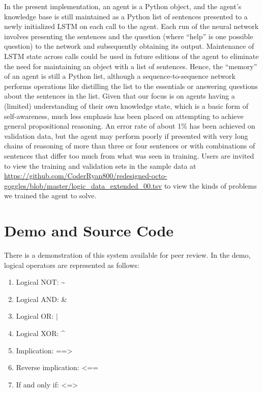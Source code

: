 \documentclass{article}
\begin{document}
In the present implementation, an agent is a Python object, and the agent’s knowledge base is still maintained as a Python list of sentences presented to a newly initialized LSTM on each call to the agent. Each run of the neural network involves presenting the sentences and the question (where “help” is one possible question) to the network and subsequently obtaining its output. Maintenance of LSTM state across calls could be used in future editions of the agent to eliminate the need for maintaining an object with a list of sentences. Hence, the “memory” of an agent is still a Python list, although a sequence-to-sequence network performs operations like distilling the list to the essentials or answering questions about the sentences in the list.
Given that our focus is on agents having a (limited) understanding of their own knowledge state, which is a basic form of self-awareness, much less emphasis has been placed on attempting to achieve general propositional reasoning. An error rate of about 1\% has been achieved on validation data, but the agent may perform poorly if presented with very long chains of reasoning of more than three or four sentences or with combinations of sentences that differ too much from what was seen in training. Users are invited to view the training and validation sets in the sample data at \url{https://github.com/CoderRyan800/redesigned-octo-goggles/blob/master/logic_data_extended_00.tsv} to view the kinds of problems we trained the agent to solve.

\section{Demo and Source Code}

There is a demonstration of this system available for peer review. 
In the demo, logical operators are represented as follows:

\begin{enumerate}
	\item Logical NOT: \textasciitilde
	\item Logical AND: \&
	\item Logical OR: $|$
	\item Logical XOR: \textasciicircum
	\item Implication: ==\textgreater
	\item Reverse implication: \textless==
	\item If and only if: \textless=\textgreater
\end{enumerate}
\end{document}
